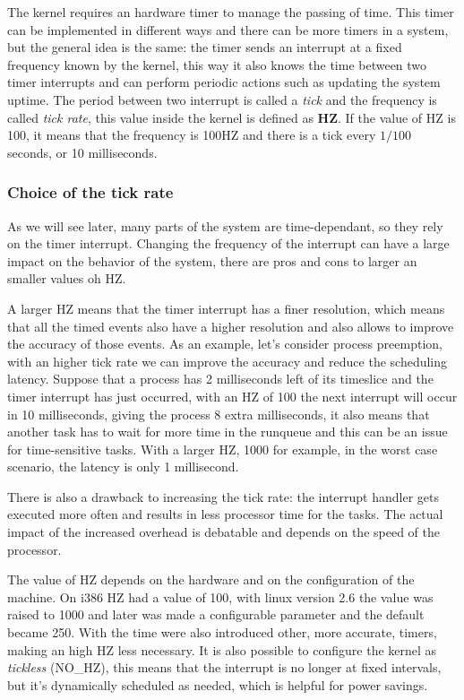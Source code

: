 \documentclass[10pt]{book}
\begin{document}
The kernel requires an hardware timer to manage the passing of time. This timer can be implemented in different ways and there can be more timers in a system, but the general idea is the same: the timer sends an interrupt at a fixed frequency known by the kernel, this way it also knows the time between two timer interrupts and can perform periodic actions such as updating the system uptime. The period between two interrupt is called a \textit{tick} and the frequency is called \textit{tick rate}, this value inside the kernel is defined as \textbf{HZ}. If the value of HZ is 100, it means that the frequency is 100HZ and there is a tick every $1/100$ seconds, or 10 milliseconds.

\subsubsection{Choice of the tick rate}
As we will see later, many parts of the system are time-dependant, so they rely on the timer interrupt. Changing the frequency of the interrupt can have a large impact on the behavior of the system, there are pros and cons to larger an smaller values oh HZ.

A larger HZ means that the timer interrupt has a finer resolution, which means that all the timed events also have a higher resolution and also allows to improve the accuracy of those events. As an example, let's consider process preemption, with an higher tick rate we can improve the accuracy and reduce the scheduling latency. Suppose that a process has 2 milliseconds left of its timeslice and the timer interrupt has just occurred, with an HZ of 100 the next interrupt will occur in 10 milliseconds, giving the process 8 extra milliseconds, it also means that another task has to wait for more time in the runqueue and this can be an issue for time-sensitive tasks. With a larger HZ, 1000 for example, in the worst case scenario, the latency is only 1 millisecond.

There is also a drawback to increasing the tick rate: the interrupt handler gets executed more often and results in less processor time for the tasks. The actual impact of the increased overhead is debatable and depends on the speed of the processor.

The value of HZ depends on the hardware and on the configuration of the machine. On i386 HZ had a value of 100, with linux version 2.6 the value was raised to 1000 and later was made a configurable parameter and the default became 250. With the time were also introduced other, more accurate, timers, making an high HZ less necessary. It is also possible to configure the kernel as \textit{tickless} (NO\_HZ), this means that the interrupt is no longer at fixed intervals, but it's dynamically scheduled as needed, which is helpful for power savings.
\end{document}
